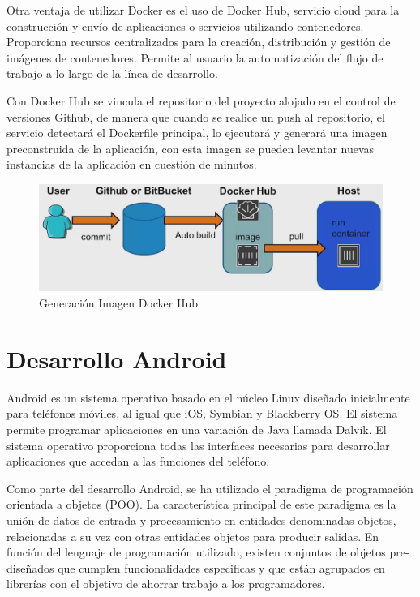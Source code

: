 \documentclass[a4paper,11pt]{book}
\begin{document}
Otra ventaja de utilizar Docker es el uso de Docker Hub\cite{dkh}, servicio cloud para la construcción y envío de aplicaciones o servicios utilizando contenedores. Proporciona recursos centralizados para la creación, distribución y gestión de imágenes de contenedores. Permite al usuario la automatización del flujo de trabajo a lo largo de la línea de desarrollo.

Con Docker Hub se vincula el repositorio del proyecto alojado en el control de versiones Github, de manera que cuando se realice un push al repositorio, el servicio detectará el Dockerfile principal, lo ejecutará y generará una imagen preconstruida de la aplicación, con esta imagen se pueden levantar nuevas instancias de la aplicación en cuestión de minutos. 


\begin{figure}[H] 
\centering 
\includegraphics[scale=0.35]{imagenes/desarrollo_herramienta/dockerhub.png}
\caption{ Generación Imagen Docker Hub\cite{dkh2}}
\end{figure}


\section{Desarrollo Android}

Android es un sistema operativo basado en el núcleo Linux diseñado inicialmente para teléfonos móviles, al igual que iOS, Symbian y Blackberry OS. El sistema permite programar aplicaciones en una variación de Java llamada Dalvik. El sistema operativo proporciona todas las interfaces necesarias para desarrollar aplicaciones que accedan a las funciones del teléfono. 

Como parte del desarrollo Android, se ha utilizado el paradigma de programación orientada a objetos (POO)\cite{ood}. La característica principal de este paradigma es la unión de datos de entrada y procesamiento en entidades denominadas objetos,  relacionadas a su vez con otras entidades objetos para producir salidas. En función del lenguaje de programación utilizado, existen conjuntos de objetos pre-diseñados que cumplen funcionalidades especificas y que están agrupados en librerías con el objetivo de ahorrar trabajo a los programadores.
\end{document}
